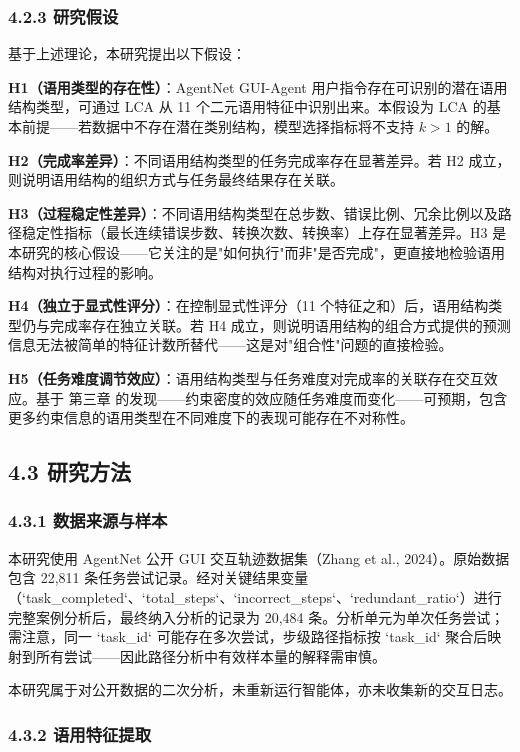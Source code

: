 \documentclass[12pt,a4paper,openany,oneside]{ctexrep}
\begin{document}
\subsubsection{4.2.3 研究假设}


基于上述理论，本研究提出以下假设：

\textbf{H1（语用类型的存在性）}：AgentNet GUI-Agent 用户指令存在可识别的潜在语用结构类型，可通过 LCA 从 11 个二元语用特征中识别出来。本假设为 LCA 的基本前提——若数据中不存在潜在类别结构，模型选择指标将不支持 $k>1$ 的解。

\textbf{H2（完成率差异）}：不同语用结构类型的任务完成率存在显著差异。若 H2 成立，则说明语用结构的组织方式与任务最终结果存在关联。

\textbf{H3（过程稳定性差异）}：不同语用结构类型在总步数、错误比例、冗余比例以及路径稳定性指标（最长连续错误步数、转换次数、转换率）上存在显著差异。H3 是本研究的核心假设——它关注的是"如何执行"而非"是否完成"，更直接地检验语用结构对执行过程的影响。

\textbf{H4（独立于显式性评分）}：在控制显式性评分（11 个特征之和）后，语用结构类型仍与完成率存在独立关联。若 H4 成立，则说明语用结构的组合方式提供的预测信息无法被简单的特征计数所替代——这是对"组合性"问题的直接检验。

\textbf{H5（任务难度调节效应）}：语用结构类型与任务难度对完成率的关联存在交互效应。基于 第三章 的发现——约束密度的效应随任务难度而变化——可预期，包含更多约束信息的语用类型在不同难度下的表现可能存在不对称性。

\subsection{4.3 研究方法}


\subsubsection{4.3.1 数据来源与样本}


本研究使用 AgentNet 公开 GUI 交互轨迹数据集（Zhang et al., 2024）。原始数据包含 22,811 条任务尝试记录。经对关键结果变量（`task\_completed`、`total\_steps`、`incorrect\_steps`、`redundant\_ratio`）进行完整案例分析后，最终纳入分析的记录为 20,484 条。分析单元为单次任务尝试；需注意，同一 `task\_id` 可能存在多次尝试，步级路径指标按 `task\_id` 聚合后映射到所有尝试——因此路径分析中有效样本量的解释需审慎。

本研究属于对公开数据的二次分析，未重新运行智能体，亦未收集新的交互日志。

\subsubsection{4.3.2 语用特征提取}
\end{document}
